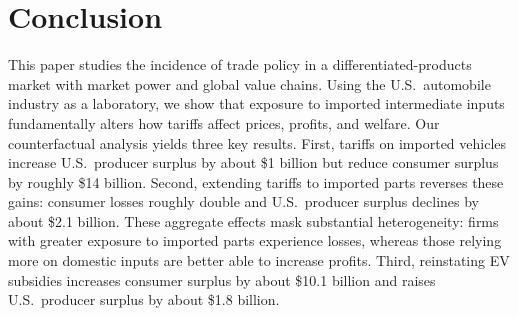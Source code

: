 \documentclass[11pt]{article}
\begin{document}

\section{Conclusion}\label{sec:sec_conclusion}

This paper studies the incidence of trade policy in a differentiated-products market with market power and global value chains. Using the U.S.\ automobile industry as a laboratory, we show that exposure to imported intermediate inputs fundamentally alters how tariffs affect prices, profits, and welfare.
Our counterfactual analysis yields three key results. First, tariffs on imported vehicles increase U.S.\ producer surplus by about \$1 billion but reduce consumer surplus by roughly \$14 billion. Second, extending tariffs to imported parts reverses these gains: consumer losses roughly double and U.S.\ producer surplus declines by about \$2.1 billion. %
These aggregate effects mask substantial heterogeneity: firms with greater exposure to imported parts experience losses, whereas those relying more on domestic inputs are better able to increase profits. Third, reinstating EV subsidies increases consumer surplus by about \$10.1 billion and raises U.S.\ producer surplus by about \$1.8 billion.
\end{document}
